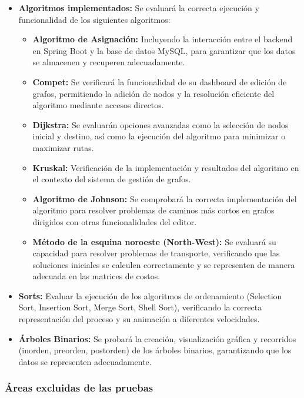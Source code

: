 \documentclass[stu, 12pt, letterpaper, donotrepeattitle, floatsintext, natbib]{apa7}
\begin{document}
\begin{itemize}
    \item \textbf{Algoritmos implementados:} Se evaluará la correcta ejecución y funcionalidad de los siguientes algoritmos:
    \begin{itemize}
        \item \textbf{Algoritmo de Asignación:} Incluyendo la interacción entre el backend en Spring Boot y la base de datos MySQL, para garantizar que los datos se almacenen y recuperen adecuadamente.
        \item \textbf{Compet:} Se verificará la funcionalidad de su dashboard de edición de grafos, permitiendo la adición de nodos y la resolución eficiente del algoritmo mediante accesos directos.
        \item \textbf{Dijkstra:} Se evaluarán opciones avanzadas como la selección de nodos inicial y destino, así como la ejecución del algoritmo para minimizar o maximizar rutas.
        \item \textbf{Kruskal:} Verificación de la implementación y resultados del algoritmo en el contexto del sistema de gestión de grafos.
        \item \textbf{Algoritmo de Johnson:} Se comprobará la correcta implementación del algoritmo para resolver problemas de caminos más cortos en grafos dirigidos con otras funcionalidades del editor.
        \item \textbf{Método de la esquina noroeste (North-West):} Se evaluará su capacidad para resolver problemas de transporte, verificando que las soluciones iniciales se calculen correctamente y se representen de manera adecuada en las matrices de costos.
    \end{itemize}

        \item \textbf{Sorts:} Evaluar la ejecución de los algoritmos de ordenamiento (Selection Sort, Insertion Sort, Merge Sort, Shell Sort), verificando la correcta representación del proceso y su animación a diferentes velocidades.
        \item \textbf{Árboles Binarios:} Se probará la creación, visualización gráfica y recorridos (inorden, preorden, postorden) de los árboles binarios, garantizando que los datos se representen adecuadamente.
\end{itemize}

\subsubsection{Áreas excluidas de las pruebas}
\end{document}
